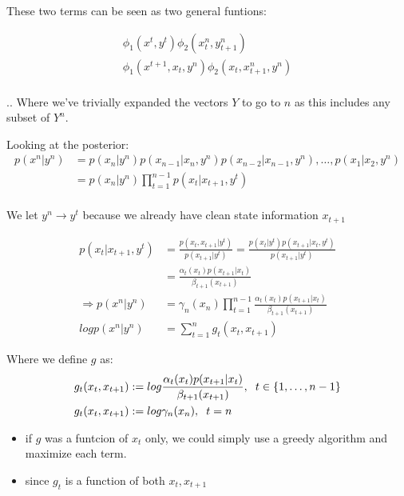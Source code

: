 \documentclass{article}
\begin{document}
These two terms can be seen as two general funtions:

\begin{eqnarray*}
\phi_1(x^t, y^t)\phi_2(x_{t}^{n}, y_{t+1}^{n})\\
\phi_1(x^{t+1}, x_t, y^n) \phi_2(x_t, x_{t+1}^{n}, y^n)\\
\end{eqnarray*}

.. Where we've trivially expanded the vectors $Y$ to go to $n$ as this includes any subset of $Y^n$.  

Looking at the posterior:
\begin{eqnarray*}
p(x^n | y^n) &= p(x_n | y^n) p(x_{n-1} | x_n, y^n)p(x_{n-2} | x_{n-1}, y^n),\dots, p(x_1 | x_2, y^n)\\
&= p(x_n | y^n) \prod_{t=1}^{n-1}p(x_t | x_{t+1}, y^t)\\
\end{eqnarray*}

We let $y^n \rightarrow y^t$ because we already have clean state information $x_{t+1}$

\begin{eqnarray*}
p(x_t | x_{t+1}, y^t) &= \frac{p(x_t , x_{t+1} | y^t)}{p(x_{t+1} | y^t)} = \frac{p(x_t | y^t) p(x_{t+1} | x_t , y^t)}{p(x_{t+1} | y^t)}\\
&= \frac{\alpha_t (x_t) p(x_{t+1} | x_t)}{\beta_{t+1}(x_{t+1})}\\
\Rightarrow p(x^n | y^n) &= \gamma_n (x_n) \prod_{t=1}^{n-1} \frac{\alpha_t (x_t) p(x_{t+1} | x_t)}{\beta_{t+1} (x_{t+1})}\\
log p(x^n | y^n) &= \sum_{t = 1}^{n} g_t (x_t, x_{t+1})
\end{eqnarray*}

Where  we define $g$ as:
\begin{eqnarray*}
g_t(x_t, x_{t+1}) &:= log \frac{\alpha_t (x_t) p(x_{t+1} | x_t)}{\beta_{t+1}(x_{t+1})}, \hspace{2 mm} t \in \{1, \dots , n-1\}\\
g_t(x_t, x_{t+1}) &:= log \gamma_n (x_n), \hspace{2 mm } t = n
\end{eqnarray*}	

\begin{itemize}
	\item  if $g$ was a funtcion of $x_t$ only, we could simply use a greedy algorithm and maximize each term.
	\item since $g_t$ is a function of both $x_t, x_{t+1}$
\end{itemize}
\end{document}
